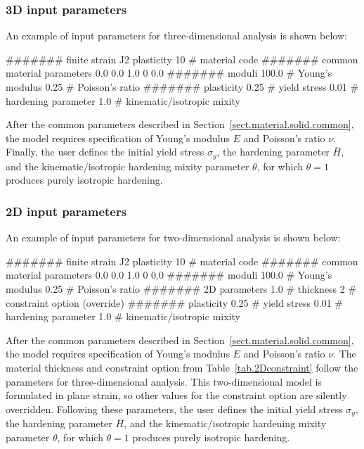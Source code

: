 \subsubsection{3D input parameters}
An example of input parameters for three-dimensional analysis is shown 
below:
\begin{inputfile}
####### finite strain J2 plasticity
10    # material code
####### common material parameters
0.0    0.0    1.0
0      0.0
####### moduli
100.0 # Young's modulus
0.25  # Poisson's ratio
####### plasticity
0.25  # yield stress
0.01  # hardening parameter
1.0   # kinematic/isotropic mixity
\end{inputfile}
After the common parameters described in 
Section~\ref{sect.material.solid.common}, the 
model requires specification of Young's modulus 
$E$ and Poisson's ratio $\nu$. Finally, the user defines the initial 
yield stress $\sigma_{y}$, the hardening parameter $\bar{H}$, and the 
kinematic/isotropic hardening mixity parameter $\theta$, 
for which $\theta = 1$ produces purely isotropic hardening.

\subsubsection{2D input parameters}
An example of input parameters for two-dimensional analysis is shown 
below:
\begin{inputfile}
####### finite strain J2 plasticity
10    # material code
####### common material parameters
0.0    0.0    1.0
0      0.0
####### moduli
100.0 # Young's modulus
0.25  # Poisson's ratio
####### 2D parameters
1.0   # thickness
2     # constraint option (override)
####### plasticity
0.25  # yield stress
0.01  # hardening parameter
1.0   # kinematic/isotropic mixity
\end{inputfile}
After the common parameters described in 
Section~\ref{sect.material.solid.common}, the 
model requires specification of Young's modulus 
$E$ and Poisson's ratio $\nu$. 
The material thickness and 
constraint option from Table~\ref{tab.2Dconstraint} 
follow the parameters for three-dimensional analysis.
This two-dimensional model is formulated in plane strain,
so other values for the constraint option are silently
overridden.
Following these parameters, 
the user defines the initial 
yield stress $\sigma_{y}$, the hardening parameter $\bar{H}$, and the 
kinematic/isotropic hardening mixity parameter $\theta$, 
for which $\theta = 1$ produces purely isotropic hardening.

